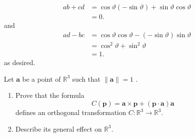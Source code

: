 \documentclass[12 pt, letterpaper]{hmcpset}
\begin{document}
\begin{solution}
\begin{enumerate}
\[\begin{split}
					ab + cd & = \cos{\vartheta} (- \sin{\vartheta}) + \sin{\vartheta} \cos{\vartheta} \\
						& = 0.
				\end{split}
			\]
			and
			\[
				\begin{split}
					ad - bc & = \cos{\vartheta} \cos{\vartheta} - (- \sin{\vartheta}) \sin{\vartheta} \\
						& = \cos^{2}{\vartheta} + \sin^{2}{\vartheta} \\
						& = 1.
				\end{split}
			\]
			as desired.
	\end{enumerate}
\end{solution}

\pagebreak

\begin{problem}[Problem 3.]
	Let $\mathbf{a}$  be a point of $\mathbb{R}^{3}$  such that $\lVert \mathbf{a} \rVert = 1$ .
	\begin{enumerate}
		\item Prove that the formula
			\[
				C(\mathbf{p}) = \mathbf{a} \times \mathbf{p} + (\mathbf{p} \cdot \mathbf{a}) \mathbf{a}
			\]
			defines an orthogonal transformation $C : \mathbb{R}^{3} \to \mathbb{R}^{3}$.
		\item Describe its general effect on $\mathbb{R}^{3}$.
	\end{enumerate}
\end{problem}
\end{document}
